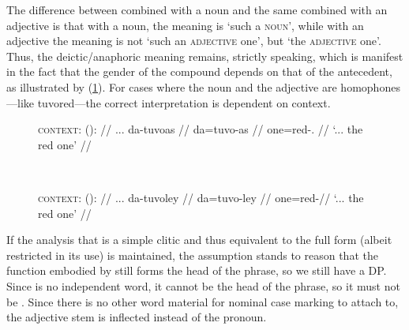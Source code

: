 The difference between  combined with a noun and the same
combined with an adjective is that with a noun, the meaning is `such a
\textsc{noun}', while with an adjective the meaning is not `such an
\textsc{adjective} one', but `the \textsc{adjective} one'. Thus, the
deictic/anaphoric meaning remains, strictly speaking, which is manifest in the
fact that the gender of the compound depends on that of the antecedent, as
illustrated by (\ref{ex:danoungender}). For cases where the noun and the
adjective are homophones---like  {tuvo}{red}---the correct
interpretation is dependent on context.

\begin{figure}
\ex{}\label{ex:danoungender}
\begin{minipage}[t]{.5\remaining}
\tl\quad\begingl
	\glpreamble \textsc{context:}  (\An{}): //
	\gla ... da-tuvoas //
	\glb {} da=tuvo-as //
	\glc {} one=red-\Parg{}.\An{} //
	\glft `... the red one' // 
\endgl
\end{minipage}
~
\begin{minipage}[t]{.5\remaining}
\tl\quad\begingl
	\glpreamble \textsc{context:}  (\Inan{}): //
	\gla ... da-tuvoley //
	\glb {} da=tuvo-ley //
	\glc {} one=red-\PargI //
	\glft `... the red one' // 
\endgl
\end{minipage}
\xe
\end{figure}

If the analysis that  is a simple clitic and thus equivalent to
the full form  (albeit restricted in its use) is maintained,
the assumption stands to reason that the function embodied by 
still forms the head of the phrase, so we still have a DP. Since 
is no independent word, it cannot be the head of the phrase, so it must not be
. Since there is no other word material for nominal case marking to
attach to, the adjective stem is inflected instead of the pronoun.


